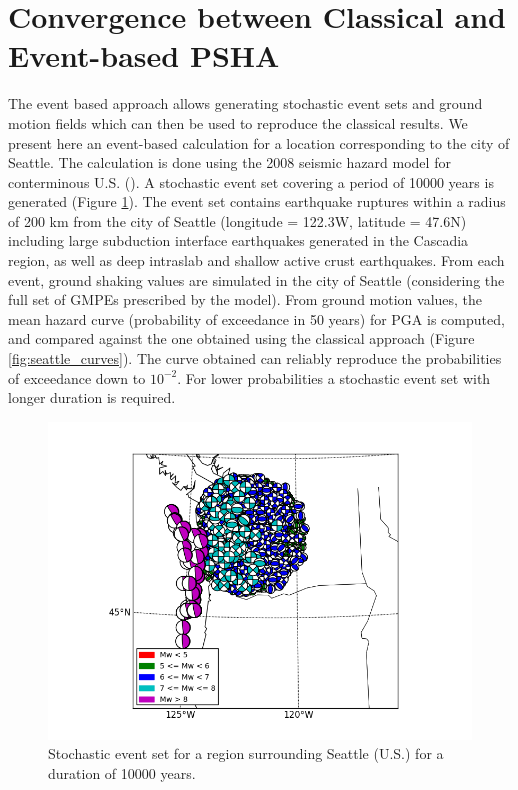\section{Convergence between Classical and Event-based PSHA}
The event based approach allows generating stochastic event sets and ground
motion fields which can then be used to reproduce the classical results. We
present here an event-based calculation for a location corresponding to the city
of Seattle. The calculation is done using the 2008 seismic hazard model for
conterminous U.S. (\cite{petersen2008}). A stochastic event set covering a  
period of 10000 years is generated (Figure \ref{fig:seattle_ses}).
%
The event set contains earthquake ruptures within a radius of 200 km from the
city of Seattle (longitude = 122.3W, latitude = 47.6N) including large
subduction interface earthquakes generated in the Cascadia region, as well as
deep intraslab and shallow active crust earthquakes. From each event, ground
shaking values are simulated in the city of Seattle (considering the full set of
GMPEs prescribed by the model). From ground motion values, the mean hazard curve
(probability of exceedance in 50 years) for PGA is computed, and compared
against the one obtained using the classical approach (Figure
\ref{fig:seattle_curves}). The curve obtained can reliably reproduce the
probabilities of exceedance down to $10^{-2}$. For lower probabilities a
stochastic event set with longer duration is required.
\begin{figure}
\centering
\includegraphics[width=14cm]{./Pictures/ses_USA_NSHMP2008.png}
\caption{Stochastic event set for a region surrounding Seattle (U.S.) for a duration of 10000 years.}
\label{fig:seattle_ses}
\end{figure}
